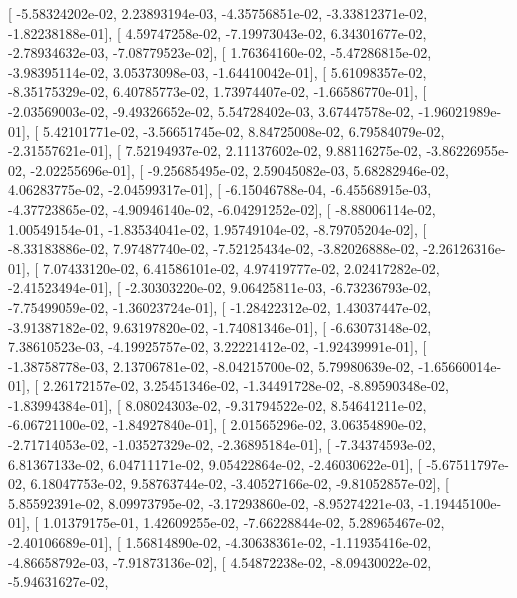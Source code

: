 \documentclass{article}
\begin{document}
       [ -5.58324202e-02,   2.23893194e-03,  -4.35756851e-02,
         -3.33812371e-02,  -1.82238188e-01],
       [  4.59747258e-02,  -7.19973043e-02,   6.34301677e-02,
         -2.78934632e-03,  -7.08779523e-02],
       [  1.76364160e-02,  -5.47286815e-02,  -3.98395114e-02,
          3.05373098e-03,  -1.64410042e-01],
       [  5.61098357e-02,  -8.35175329e-02,   6.40785773e-02,
          1.73974407e-02,  -1.66586770e-01],
       [ -2.03569003e-02,  -9.49326652e-02,   5.54728402e-03,
          3.67447578e-02,  -1.96021989e-01],
       [  5.42101771e-02,  -3.56651745e-02,   8.84725008e-02,
          6.79584079e-02,  -2.31557621e-01],
       [  7.52194937e-02,   2.11137602e-02,   9.88116275e-02,
         -3.86226955e-02,  -2.02255696e-01],
       [ -9.25685495e-02,   2.59045082e-03,   5.68282946e-02,
          4.06283775e-02,  -2.04599317e-01],
       [ -6.15046788e-04,  -6.45568915e-03,  -4.37723865e-02,
         -4.90946140e-02,  -6.04291252e-02],
       [ -8.88006114e-02,   1.00549154e-01,  -1.83534041e-02,
          1.95749104e-02,  -8.79705204e-02],
       [ -8.33183886e-02,   7.97487740e-02,  -7.52125434e-02,
         -3.82026888e-02,  -2.26126316e-01],
       [  7.07433120e-02,   6.41586101e-02,   4.97419777e-02,
          2.02417282e-02,  -2.41523494e-01],
       [ -2.30303220e-02,   9.06425811e-03,  -6.73236793e-02,
         -7.75499059e-02,  -1.36023724e-01],
       [ -1.28422312e-02,   1.43037447e-02,  -3.91387182e-02,
          9.63197820e-02,  -1.74081346e-01],
       [ -6.63073148e-02,   7.38610523e-03,  -4.19925757e-02,
          3.22221412e-02,  -1.92439991e-01],
       [ -1.38758778e-03,   2.13706781e-02,  -8.04215700e-02,
          5.79980639e-02,  -1.65660014e-01],
       [  2.26172157e-02,   3.25451346e-02,  -1.34491728e-02,
         -8.89590348e-02,  -1.83994384e-01],
       [  8.08024303e-02,  -9.31794522e-02,   8.54641211e-02,
         -6.06721100e-02,  -1.84927840e-01],
       [  2.01565296e-02,   3.06354890e-02,  -2.71714053e-02,
         -1.03527329e-02,  -2.36895184e-01],
       [ -7.34374593e-02,   6.81367133e-02,   6.04711171e-02,
          9.05422864e-02,  -2.46030622e-01],
       [ -5.67511797e-02,   6.18047753e-02,   9.58763744e-02,
         -3.40527166e-02,  -9.81052857e-02],
       [  5.85592391e-02,   8.09973795e-02,  -3.17293860e-02,
         -8.95274221e-03,  -1.19445100e-01],
       [  1.01379175e-01,   1.42609255e-02,  -7.66228844e-02,
          5.28965467e-02,  -2.40106689e-01],
       [  1.56814890e-02,  -4.30638361e-02,  -1.11935416e-02,
         -4.86658792e-03,  -7.91873136e-02],
       [  4.54872238e-02,  -8.09430022e-02,  -5.94631627e-02,
\end{document}
